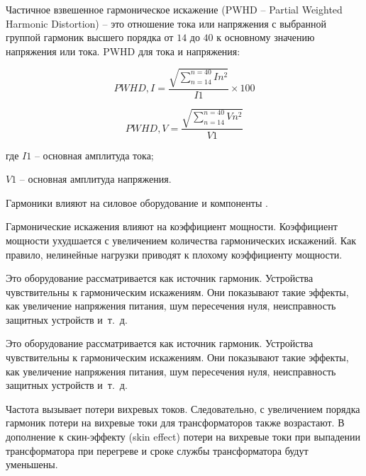 Частичное взвешенное гармоническое искажение (PWHD – Partial Weighted Harmonic Distortion) -- это отношение тока или напряжения с выбранной группой гармоник высшего порядка от $14$ до $40$ к основному значению напряжения или тока. PWHD для тока и напряжения:

\begin{equation}
	\label{eq:equation1.17}
PWHD,I = \frac{\sqrt{\displaystyle\sum_{n=14}^{n=40} In^2}}{I1} \times 100 
\end{equation} 

\begin{equation}
	\label{eq:equation1.18}
	PWHD,V = \frac{\sqrt{\displaystyle\sum_{n=14}^{n=40} Vn^2}}{V1} 
\end{equation} 

где $I1$ – основная амплитуда тока;

$V1$ – основная амплитуда напряжения.

Гармоники влияют на силовое оборудование и компоненты \cite{soni2014review, kamenka2014six}.


Гармонические искажения влияют на коэффициент мощности. Коэффициент мощности ухудшается с увеличением количества гармонических искажений. Как правило, нелинейные нагрузки приводят к плохому коэффициенту мощности.

Это оборудование рассматривается как источник гармоник. Устройства чувствительны к гармоническим искажениям. Они показывают такие эффекты, как увеличение напряжения питания, шум пересечения нуля, неисправность защитных устройств и~т.~д.

Это оборудование рассматривается как источник гармоник. Устройства чувствительны к гармоническим искажениям. Они показывают такие эффекты, как увеличение напряжения питания, шум пересечения нуля, неисправность защитных устройств и~т.~д.

Частота вызывает потери вихревых токов. Следовательно, с увеличением порядка гармоник потери на вихревые токи для трансформаторов также возрастают. В дополнение к скин-эффекту (skin effect) потери на вихревые токи при выпадении трансформатора при перегреве и сроке службы трансформатора будут уменьшены.

